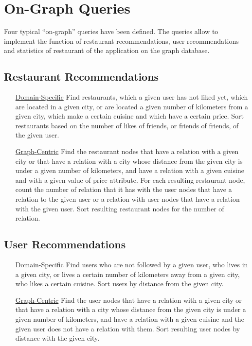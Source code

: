 \section{On-Graph Queries}

Four typical ``on-graph'' queries have been defined. The queries allow to
implement the function of restaurant recommendations, user recommendations and
statistics of restaurant of the application on the graph database.

\subsection{Restaurant Recommendations}\label{sec:restrecommend}
\begin{itemize}
	\item [\underline{Domain-Specific}] Find restaurants, which a given user
		has not liked yet, which are located in a given city, or are
		located a given number of kilometers from a given city, which
		make a certain cuisine and which have a certain price.  Sort
		restaurants based on the number of likes of friends, or friends
		of friends, of the given user.
	\item [\underline{Graph-Centric}] Find the restaurant nodes that have a
		 relation with a given city or that have a
		 relation with a city whose distance from the
		given city is under a given number of kilometers, and have a
		 relation with a given cuisine and with a given
		value of price attribute. For each resulting restaurant node,
		count the number of  relation that it has with the
		user nodes that have a  relation to the given user
		or a  relation with user nodes that have a
		 relation with the given user. Sort resulting
		restaurant nodes for the number of  relation.
\end{itemize}

\subsection{User Recommendations}\label{sec:userrecommend}
\begin{itemize}
	\item [\underline{Domain-Specific}] Find users who are not followed by a
		given user, who lives in a given city, or lives a certain number
		of kilometers away from a given city, who likes a certain
		cuisine. Sort users by distance from the given city.
	\item [\underline{Graph-Centric}] Find the user nodes that have a
		 relation with a given city or that have a
		 relation with a city whose distance from the
		given city is under a given number of kilometers, and have a
		 relation with a given cuisine and the given user
		does not have a  relation with them. Sort
		resulting user nodes by distance with the given city.
\end{itemize}

